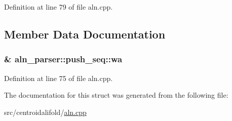 Definition at line 79 of file aln.\+cpp.



\subsection{Member Data Documentation}
\hypertarget{structaln__parser_1_1push__seq_af9e4d77c206f25d1ad680fbe32dbafdf}{
\subsubsection[{wa}]{\& aln\+\_\+parser\+::push\+\_\+seq\+::wa}}\label{structaln__parser_1_1push__seq_af9e4d77c206f25d1ad680fbe32dbafdf}


Definition at line 75 of file aln.\+cpp.



The documentation for this struct was generated from the following file\+:\begin{DoxyCompactItemize}
\item 
src/centroidalifold/\hyperlink{aln_8cpp}{aln.\+cpp}\end{DoxyCompactItemize}
